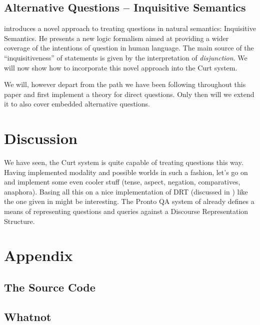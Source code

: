 \documentclass[12pt,a4paper]{article}
\newcommand{\abbr}{\textsf} %
\newcommand{\pn}{\textsf} %
\theoremstyle{remark} \newtheorem*{termin}{Terminology} %
\begin{document}
\subsection{Alternative Questions – Inquisitive Semantics}\label{sec:altq}

\cite{g:is} introduces a novel approach to treating questions in natural
semantics: \pn{Inquisitive Semantics}. He presents a new logic
formalism aimed at providing a wider coverage of the intentions of question in
human language. The main source of the ``inquisitiveness'' of statements is
given by the interpretation of \emph{disjunction}. We will now show how to
incorporate this novel approach into the \pn{Curt} system.

We will, however depart from the path we have been following throughout this
paper and first implement a theory for direct questions. Only then will we extend
it to also cover embedded alternative questions.

\section{Discussion}\label{sec:discussion}

We have seen, the Curt system is quite capable of treating questions this way.
Having implemented modality and possible worlds in such a fashion, let's go on
and implement some even cooler stuff (tense, aspect, negation, comparatives,
anaphora). Basing all this on a nice implementation of DRT (discussed in
\cite{kampreyle:drt}) like the one given in \cite{blackburnbos:cl2} might be
interesting. The Pronto \abbr{QA} system of \cite{prontoqa} already defines a
means of representing questions and queries against a Discourse Representation
Structure.

\section{Appendix}

\subsection{The Source Code}

\subsection{Whatnot}


\end{document}
